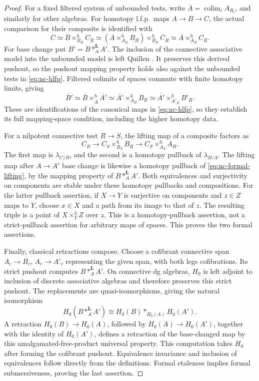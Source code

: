 \documentclass[12pt]{amsart}
\theoremstyle{definition}
\theoremstyle{remark}
\numberwithin{equation}{section}
\begin{document}
\begin{proof}
For a fixed filtered system of unbounded tests, write
$\overline A=\operatorname*{colim}_i A_{R_i}$, and similarly for
other algebras. For homotopy l.f.p.\ maps $A\to B\to C$, the
actual comparison for their composite is identified with
\[
 \overline C
   \simeq\overline B\times^h_{B_R}C_R
   \simeq
     (\overline A\times^h_{A_R}B_R)\times^h_{B_R}C_R
   \simeq\overline A\times^h_{A_R}C_R.
\]
For base change put $B'=B*^{\mathbf L}_A A'$. The inclusion of the
connective associative model into the unbounded model is left
Quillen \cite[Definition~1.2, p.~4]{PridhamNC2023}. It preserves
this derived pushout, so the pushout mapping property holds also
against the unbounded tests in \eqref{eq:nc-hlfp}. Filtered
colimits of spaces commute with finite homotopy limits, giving
\[
 \overline {B'}
   \simeq\overline B\times^h_{\overline A}\overline {A'}
   \simeq\overline {A'}\times^h_{A_R}B_R
   \simeq\overline {A'}\times^h_{A'_R}B'_R.
\]
These are identifications of the canonical maps in
\eqref{eq:nc-hlfp}, so they establish its full mapping-space
condition, including the higher homotopy data.

For a nilpotent connective test $R\to S$, the lifting map of a
composite factors as
\[
 C_R\longrightarrow C_S\times^h_{B_S}B_R
       \longrightarrow C_S\times^h_{A_S}A_R.
\]
The first map is $\lambda_{C/B}$, and the second is a homotopy
pullback of $\lambda_{B/A}$. The lifting map after $A\to A'$ base
change is likewise a homotopy pullback of
\eqref{eq:nc-formal-lifting}, by the mapping property of
$B*^{\mathbf L}_A A'$. Both equivalences and surjectivity on
components are stable under these homotopy pullbacks and
compositions. For the latter pullback assertion, if $X\to Y$ is
surjective on components and $z\in Z$ maps to $Y$, choose $x\in X$
and a path from its image to that of $z$. The resulting triple is
a point of $X\times_Y^h Z$ over $z$. This is a homotopy-pullback
assertion, not a strict-pullback assertion for arbitrary maps of
spaces. This proves the two formal assertions.

Finally, classical retractions compose. Choose a cofibrant
connective span $A_c\to B_c$, $A_c\to A'_c$ representing the given
span, with both legs cofibrations. Its strict pushout computes
$B*^{\mathbf L}_A A'$. On connective dg algebras, $H_0$ is left
adjoint to inclusion of discrete associative algebras and
therefore preserves this strict pushout. The replacements are
quasi-isomorphisms, giving the natural isomorphism
\[
 H_0(B*^{\mathbf L}_A A')
       \cong H_0(B)*_{H_0(A)}H_0(A').
\]
A retraction $H_0(B)\to H_0(A)$, followed by
$H_0(A)\to H_0(A')$, together with the identity of $H_0(A')$,
defines a retraction of the base-changed map by this
amalgamated-free-product universal property. This computation
takes $H_0$ after forming the cofibrant pushout. Equivalence invariance
and inclusion of equivalences follow directly from the
definitions. Formal etaleness implies formal submersiveness,
proving the last assertion.
\end{proof}
\end{document}
